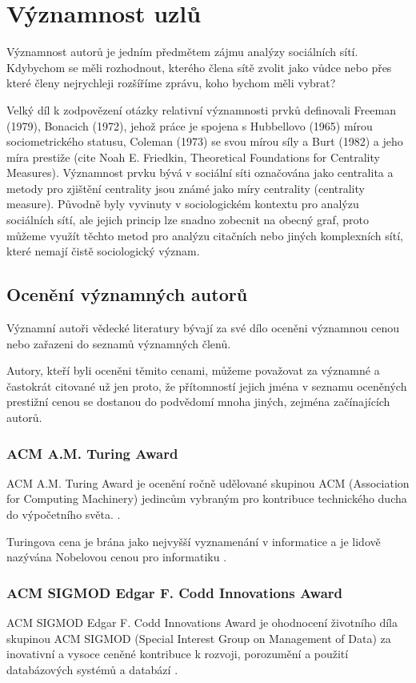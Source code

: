 \documentclass{bakalarka}
\begin{document}
\section{Významnost uzlů}
Významnost autorů je jedním předmětem zájmu analýzy sociálních sítí. Kdybychom
se měli rozhodnout, kterého člena sítě zvolit jako vůdce nebo přes které členy
nejrychleji rozšíříme zprávu, koho bychom měli vybrat? 

Velký díl k zodpovězení otázky relativní významnosti prvků definovali Freeman
(1979), Bonacich (1972), jehož práce je spojena s Hubbellovo (1965) mírou
sociometrického statusu, Coleman (1973) se svou mírou síly a Burt (1982) a jeho
míra prestiže (cite Noah E. Friedkin, Theoretical Foundations for Centrality Measures). Významnost prvku bývá v sociální síti označována jako centralita
a metody pro zjištění centrality jsou známé jako míry centrality (centrality
measure). Původně byly vyvinuty v sociologickém kontextu pro analýzu sociálních
sítí, ale jejich princip lze snadno zobecnit na obecný graf, proto můžeme
využít těchto metod pro analýzu citačních nebo jiných komplexních sítí, které
nemají čistě sociologický význam.

\subsection{Ocenění významných autorů}
Významní autoři vědecké literatury bývají za své dílo oceněni významnou cenou
nebo zařazeni do seznamů významných členů.

Autory, kteří byli oceněni těmito cenami, můžeme považovat za významné a
častokrát citované už jen proto, že přítomností jejich jména v seznamu
oceněných prestižní cenou se dostanou do podvědomí mnoha jiných, zejména
začínajících autorů.

\subsubsection{ACM A.M. Turing Award}
ACM A.M. Turing Award je ocenění ročně udělované skupinou ACM (Association for
Computing Machinery) jedincům vybraným pro kontribuce technického ducha do
výpočetního světa.
\cite{turingaward}.

Turingova cena je brána jako nejvyšší vyznamenání v informatice a je lidově
nazývána Nobelovou cenou pro informatiku \cite[p.~317]{dasgupta}.

\subsubsection{ACM SIGMOD Edgar F. Codd Innovations Award}
ACM SIGMOD Edgar F. Codd Innovations Award je ohodnocení životního díla
skupinou ACM SIGMOD (Special Interest Group on Management of Data)  za
inovativní a vysoce ceněné kontribuce k rozvoji, porozumění a použití
databázových systémů a databází \cite{sigmodinnovations}.
\end{document}
